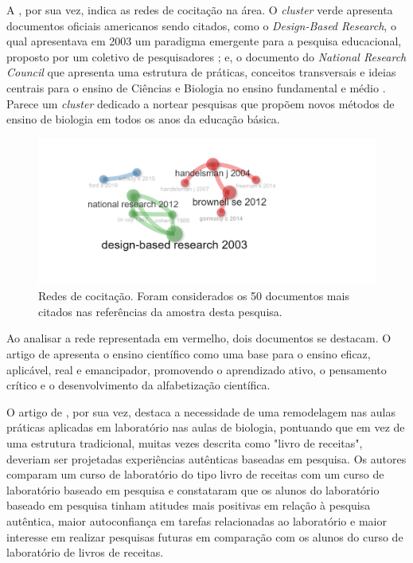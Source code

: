 \documentclass[portuguese]{textolivre}
\begin{document}
A , por sua vez, indica as redes de cocitação na área. O \textit{cluster} verde apresenta documentos oficiais americanos sendo citados, como o \textit{Design-Based Research}, o qual apresentava em 2003 um paradigma emergente para a pesquisa educacional, proposto por um coletivo de pesquisadores \cite{the_design-based_research_collective_design-based_2003}; e, o documento do \textit{National Research Council} que apresenta uma estrutura de práticas, conceitos transversais e ideias centrais para o ensino de Ciências e Biologia no ensino fundamental e médio \cite{national_research_council_framework_2012}. Parece um \textit{cluster} dedicado a nortear pesquisas que propõem novos métodos de ensino de biologia em todos os anos da educação básica.

\begin{figure}
    \centering
    \includegraphics[width=0.8\linewidth]{Fig6.png}
    \caption{Redes de cocitação. Foram considerados os 50 documentos mais citados nas referências da amostra desta pesquisa.}
    \label{fig6}
\end{figure}

Ao analisar a rede representada em vermelho, dois documentos se destacam. O artigo de \textcite{handelsman_scientific_2004} apresenta o ensino científico como uma base para o ensino eficaz, aplicável, real e emancipador, promovendo o aprendizado ativo, o pensamento crítico e o desenvolvimento da alfabetização científica.

O artigo de \textcite{brownell_undergraduate_2012}, por sua vez, destaca a necessidade de uma remodelagem nas aulas práticas aplicadas em laboratório nas aulas de biologia, pontuando que em vez de uma estrutura tradicional, muitas vezes descrita como "livro de receitas", deveriam ser projetadas experiências autênticas baseadas em pesquisa. Os autores comparam um curso de laboratório do tipo livro de receitas com um curso de laboratório baseado em pesquisa e constataram que os alunos do laboratório baseado em pesquisa tinham atitudes mais positivas em relação à pesquisa autêntica, maior autoconfiança em tarefas relacionadas ao laboratório e maior interesse em realizar pesquisas futuras em comparação com os alunos do curso de laboratório de livros de receitas.
\end{document}
